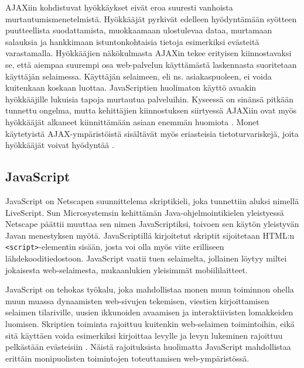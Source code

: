 AJAXiin kohdistuvat hyökkäykset eivät eroa suuresti vanhoista murtautumismenetelmistä. Hyökkääjät pyrkivät edelleen hyödyntämään syötteen puutteellista suodattamista, muokkaamaan 
ulostulevaa dataa, murtamaan salauksia ja hankkimaan istuntonkohtaisia tietoja esimerkiksi evästeitä varastamalla. Hyökkääjien näkökulmasta AJAXin tekee erityisen kiinnostavaksi se,
että aiempaa suurempi osa web-palvelun käyttämästä laskennasta suoritetaan käyttäjän selaimessa. Käyttäjän selaimeen, eli ns. asiakaspuoleen, ei voida kuitenkaan koskaan luottaa.
JavaScriptien huolimaton käyttö avaakin hyökkääjille lukuisia tapoja murtautua palveluihin. Kyseessä on sinänsä pitkään tunnettu ongelma, mutta kehittäjien kiinnostuksen siirtyessä 
AJAXiin ovat myös hyökkääjät alkaneet kiinnittämään asiaan enemmän huomiota \cite{AJAX}. Monet käytetyistä AJAX-ympäristöistä sisältävät myös eriasteisia tietoturvariskejä, joita 
hyökkääjät voivat hyödyntää \cite{JSH}.

\subsection{JavaScript}

JavaScript on Netscapen suunnittelema skriptikieli, joka tunnettiin aluksi nimellä LiveScript. Sun Microsystemsin kehittämän Java-ohjelmointikielen yleistyessä Netscape päättii muuttaa
sen nimen JavaScriptiksi, toivoen sen käytön yleistyvän Javan menestyksen myötä. JavaScriptillä kirjoitetut skriptit sijoitetaan HTML:n \texttt{<script>}-elementin sisään, josta voi 
olla myös viite erilliseen lähdekooditiedostoon. JavaScript vaatii tuen selaimelta, jollainen löytyy miltei jokaisesta web-se\-lai\-mes\-ta, mukaanlukien yleisimmät mobiililaitteet.

JavaScript on tehokas työkalu, joka mahdollistaa monen muun toiminnon ohella muun muassa dynaamisten web-sivujen tekemisen, viestien kirjoittamisen selaimen tilariville, uusien ikkunoiden
avaamisen ja interaktiivisten lomakkeiden luomisen. Skriptien toiminta rajoittuu kuitenkin web-selaimen toimintoihin, eikä sitä käyttäen voida esimerkiksi kirjoittaa levylle ja levyn 
lukeminen rajoittuu pelkästään evästeisiin \cite{JavaScript}. Näistä rajoituksista huolimatta JavaScript mahdollistaa erittäin monipuolisten toimintojen toteuttamisen web-ympäristössä.

